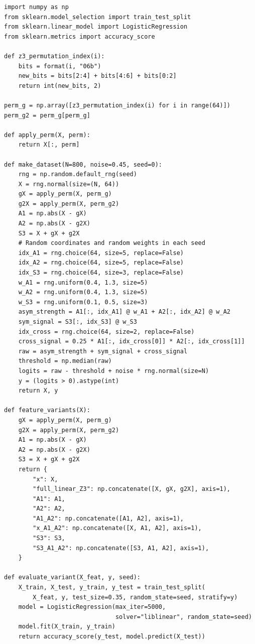 \documentclass[11pt,a4paper]{report}
\begin{document}
\label{app:ch3-lst15}
\begin{lstlisting}[caption=SBOHN Experiment 7: random coordinates and weights]
import numpy as np
from sklearn.model_selection import train_test_split
from sklearn.linear_model import LogisticRegression
from sklearn.metrics import accuracy_score

def z3_permutation_index(i):
    bits = format(i, "06b")
    new_bits = bits[2:4] + bits[4:6] + bits[0:2]
    return int(new_bits, 2)

perm_g = np.array([z3_permutation_index(i) for i in range(64)])
perm_g2 = perm_g[perm_g]

def apply_perm(X, perm):
    return X[:, perm]

def make_dataset(N=800, noise=0.45, seed=0):
    rng = np.random.default_rng(seed)
    X = rng.normal(size=(N, 64))
    gX = apply_perm(X, perm_g)
    g2X = apply_perm(X, perm_g2)
    A1 = np.abs(X - gX)
    A2 = np.abs(X - g2X)
    S3 = X + gX + g2X
    # Random coordinates and random weights in each seed
    idx_A1 = rng.choice(64, size=5, replace=False)
    idx_A2 = rng.choice(64, size=5, replace=False)
    idx_S3 = rng.choice(64, size=3, replace=False)
    w_A1 = rng.uniform(0.4, 1.3, size=5)
    w_A2 = rng.uniform(0.4, 1.3, size=5)
    w_S3 = rng.uniform(0.1, 0.5, size=3)
    asym_strength = A1[:, idx_A1] @ w_A1 + A2[:, idx_A2] @ w_A2
    sym_signal = S3[:, idx_S3] @ w_S3
    idx_cross = rng.choice(64, size=2, replace=False)
    cross_signal = 0.25 * A1[:, idx_cross[0]] * A2[:, idx_cross[1]]
    raw = asym_strength + sym_signal + cross_signal
    threshold = np.median(raw)
    logits = raw - threshold + noise * rng.normal(size=N)
    y = (logits > 0).astype(int)
    return X, y

def feature_variants(X):
    gX = apply_perm(X, perm_g)
    g2X = apply_perm(X, perm_g2)
    A1 = np.abs(X - gX)
    A2 = np.abs(X - g2X)
    S3 = X + gX + g2X
    return {
        "x": X,
        "full_linear_Z3": np.concatenate([X, gX, g2X], axis=1),
        "A1": A1,
        "A2": A2,
        "A1_A2": np.concatenate([A1, A2], axis=1),
        "x_A1_A2": np.concatenate([X, A1, A2], axis=1),
        "S3": S3,
        "S3_A1_A2": np.concatenate([S3, A1, A2], axis=1),
    }

def evaluate_variant(X_feat, y, seed):
    X_train, X_test, y_train, y_test = train_test_split(
        X_feat, y, test_size=0.35, random_state=seed, stratify=y)
    model = LogisticRegression(max_iter=5000,
                               solver="liblinear", random_state=seed)
    model.fit(X_train, y_train)
    return accuracy_score(y_test, model.predict(X_test))


\end{lstlisting}
\end{document}
